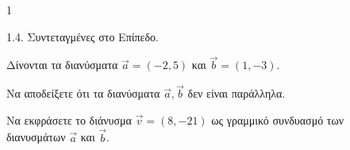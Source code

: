 \begin{ylh}{1}
    \item 1.4. Συντεταγμένες στο Επίπεδο.
\end{ylh}
Δίνονται τα διανύσματα $\vec{a} = (-2,5)$ και $\vec{b} = (1,-3)$.
\begin{alist}
\item Να αποδείξετε ότι τα διανύσματα $\vec{a}, \vec{b}$ δεν είναι παράλληλα. 
\item Να εκφράσετε το διάνυσμα $\vec{v} = (8,-21)$ ως γραμμικό συνδυασμό των διανυσμάτων $\vec{a}$ και $\vec{b}$. 
\end{alist}
